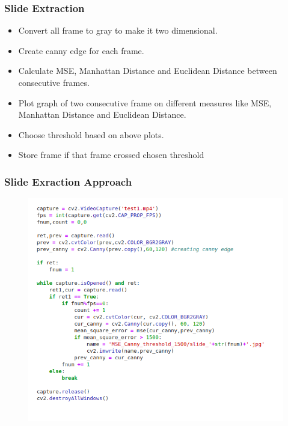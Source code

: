 \documentclass{beamer}
\begin{document}
\begin{frame}
\frametitle{Slide Extraction}

\begin{itemize}
	\item Convert all frame to gray to make it two dimensional.
	\item Create canny edge for each frame.
	\item Calculate MSE, Manhattan Distance and Euclidean Distance between consecutive frames.
	\item Plot graph of two consecutive frame on different measures like MSE, Manhattan Distance and Euclidean Distance.
	\item Choose threshold based on above plots.
	\item Store frame if that frame crossed chosen threshold
\end{itemize}

\end{frame}

\begin{frame}
\frametitle{Slide Exraction Approach}
\begin{figure}
	\centering
	\includegraphics[width=0.8\linewidth]{Presentation_Image/slide_extraction_code}
\end{figure}	
\end{frame}
\end{document}
